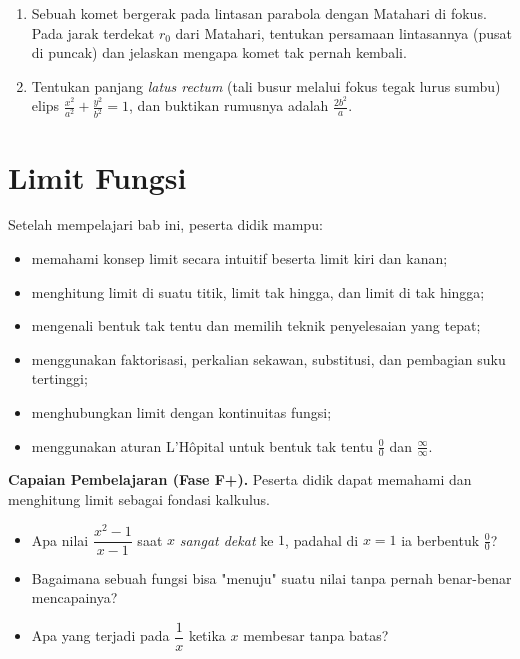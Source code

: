 \documentclass[11pt,a4paper]{report}
\theoremstyle{gaya}
\begin{document}
\begin{challenge}
\begin{enumerate}[leftmargin=*,topsep=2pt]
  \item Sebuah komet bergerak pada lintasan parabola dengan Matahari di fokus. Pada jarak terdekat $r_0$ dari Matahari, tentukan persamaan lintasannya (pusat di puncak) dan jelaskan mengapa komet tak pernah kembali.
  \item Tentukan panjang \emph{latus rectum} (tali busur melalui fokus tegak lurus sumbu) elips $\tfrac{x^2}{a^2}+\tfrac{y^2}{b^2}=1$, dan buktikan rumusnya adalah $\tfrac{2b^2}{a}$.
\end{enumerate}
\end{challenge}

\chapter{Limit Fungsi}
\begin{tujuan}
Setelah mempelajari bab ini, peserta didik mampu:
\begin{itemize}[leftmargin=*,topsep=2pt]
  \item memahami konsep limit secara intuitif beserta limit kiri dan kanan;
  \item menghitung limit di suatu titik, limit tak hingga, dan limit di tak hingga;
  \item mengenali bentuk tak tentu dan memilih teknik penyelesaian yang tepat;
  \item menggunakan faktorisasi, perkalian sekawan, substitusi, dan pembagian suku tertinggi;
  \item menghubungkan limit dengan kontinuitas fungsi;
  \item menggunakan aturan L'Hôpital untuk bentuk tak tentu $\tfrac00$ dan $\tfrac\infty\infty$.
\end{itemize}
\textbf{Capaian Pembelajaran (Fase F+).} Peserta didik dapat memahami dan menghitung limit sebagai fondasi kalkulus.
\end{tujuan}

\begin{pemantik}
\begin{itemize}[leftmargin=*,topsep=2pt]
  \item Apa nilai $\dfrac{x^2-1}{x-1}$ saat $x$ \emph{sangat dekat} ke $1$, padahal di $x=1$ ia berbentuk $\tfrac00$?
  \item Bagaimana sebuah fungsi bisa "menuju" suatu nilai tanpa pernah benar-benar mencapainya?
  \item Apa yang terjadi pada $\dfrac{1}{x}$ ketika $x$ membesar tanpa batas?
\end{itemize}
\end{pemantik}
\end{document}
